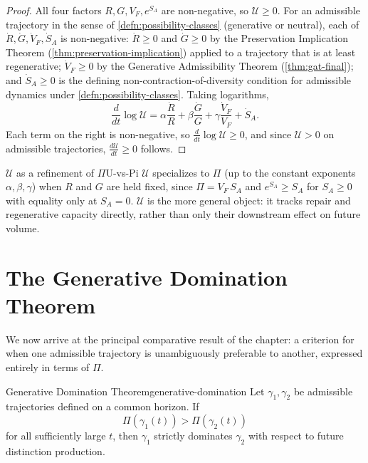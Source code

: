 \documentclass[12pt,twoside,openright]{book}
\begin{document}
\begin{proof}
  All four factors $R,G,V_F,e^{S_A}$ are non-negative, so
  $\mathcal{U}\ge0$. For an admissible trajectory in the
  sense of \cref{defn:possibility-classes} (generative or
  neutral), each of $\dot R,\dot G,\dot V_F,\dot S_A$ is
  non-negative: $\dot R\ge0$ and $\dot G\ge0$ by the
  Preservation Implication Theorem
  (\cref{thm:preservation-implication}) applied to a
  trajectory that is at least regenerative; $\dot V_F\ge0$
  by the Generative Admissibility Theorem
  (\cref{thm:gat-final}); and $\dot S_A\ge0$ is the
  defining non-contraction-of-diversity condition for
  admissible dynamics under \cref{defn:possibility-classes}.
  Taking logarithms,
  \[
    \frac{d}{dt}\log\mathcal{U}
    = \alpha\frac{\dot R}{R} + \beta\frac{\dot G}{G}
      + \gamma\frac{\dot V_F}{V_F} + \dot S_A.
  \]
  Each term on the right is non-negative, so
  $\frac{d}{dt}\log\mathcal{U}\ge0$, and since $\mathcal{U}>0$
  on admissible trajectories, $\frac{d\mathcal{U}}{dt}\ge0$
  follows.
\end{proof}

\begin{remark}{$\mathcal{U}$ as a refinement of $\Pi$}{U-vs-Pi}
  $\mathcal{U}$ specializes to $\Pi$ (up to the constant
  exponents $\alpha,\beta,\gamma$) when $R$ and $G$ are held
  fixed, since $\Pi=V_F\,S_A$ and $e^{S_A}\ge S_A$ for
  $S_A\ge0$ with equality only at $S_A=0$. $\mathcal{U}$ is
  the more general object: it tracks repair and regenerative
  capacity directly, rather than only their downstream
  effect on future volume.
\end{remark}

\section{The Generative Domination Theorem}
\label{sec:ch31-domination}

We now arrive at the principal comparative result of the
chapter: a criterion for when one admissible trajectory is
unambiguously preferable to another, expressed entirely in
terms of $\Pi$.

\begin{theorem}{Generative Domination Theorem}{generative-domination}
  Let $\gamma_1,\gamma_2$ be admissible trajectories defined
  on a common horizon. If
  \[
    \Pi(\gamma_1(t)) > \Pi(\gamma_2(t))
  \]
  for all sufficiently large $t$, then $\gamma_1$ strictly
  dominates $\gamma_2$ with respect to future distinction
  production.
\end{theorem}
\end{document}
